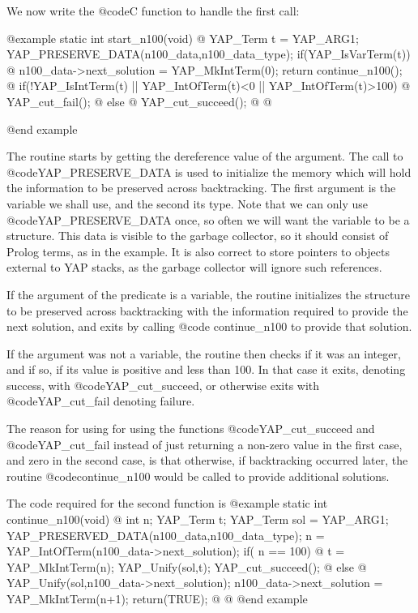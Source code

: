 {{{{{{{{We now write the @code{C} function to handle the first call:

@example
static int start_n100(void)
@{
      YAP_Term t = YAP_ARG1;
      YAP_PRESERVE_DATA(n100_data,n100_data_type);
      if(YAP_IsVarTerm(t)) @{
          n100_data->next_solution = YAP_MkIntTerm(0);
          return continue_n100();
       @}
      if(!YAP_IsIntTerm(t) || YAP_IntOfTerm(t)<0 || YAP_IntOfTerm(t)>100) @{
          YAP_cut_fail();
      @} else @{
          YAP_cut_succeed();
      @}
@}

@end example

The routine starts by getting the dereference value of the argument.
The call to @code{YAP_PRESERVE_DATA} is used to initialize the memory
which will hold the information to be preserved across
backtracking. The first argument is the variable we shall use, and the
second its type. Note that we can only use @code{YAP_PRESERVE_DATA}
once, so often we will want the variable to be a structure. This data
is visible to the garbage collector, so it should consist of Prolog
terms, as in the example. It is also correct to store pointers to
objects external to YAP stacks, as the garbage collector will ignore
such references.

If the argument of the predicate is a variable, the routine initializes the 
structure to be preserved across backtracking with the information
required to provide the next solution, and exits by calling @code{
continue_n100} to provide that solution.

If the argument was not a variable, the routine then checks if it was an
integer, and if so, if its value is positive and less than 100. In that
case it exits, denoting success, with @code{YAP_cut_succeed}, or
otherwise exits with @code{YAP_cut_fail} denoting failure.

The reason for using for using the functions @code{YAP_cut_succeed} and
@code{YAP_cut_fail} instead of just returning a non-zero value in the
first case, and zero in the second case, is that otherwise, if
backtracking occurred later, the routine @code{continue_n100} would be
called to provide additional solutions.

The code required for the second function is
@example
static int continue_n100(void)
@{
      int n;
      YAP_Term t;
      YAP_Term sol = YAP_ARG1;
      YAP_PRESERVED_DATA(n100_data,n100_data_type);
      n = YAP_IntOfTerm(n100_data->next_solution);
      if( n == 100) @{
           t = YAP_MkIntTerm(n);
           YAP_Unify(sol,t);
           YAP_cut_succeed();
        @}
       else @{
           YAP_Unify(sol,n100_data->next_solution);
           n100_data->next_solution = YAP_MkIntTerm(n+1);
           return(TRUE);
        @}
@}
@end example

}}}}}}}}
